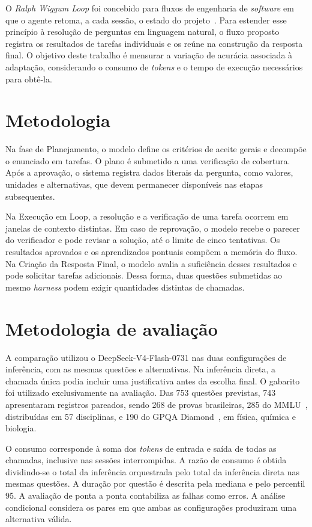 \documentclass[a4paper,10pt, twocolumn]{article}
\begin{document}
O \textit{Ralph Wiggum Loop} foi concebido para fluxos de engenharia de \textit{software} em que o agente retoma, a cada sessão, o estado do projeto~\cite{huntley}. Para estender esse princípio à resolução de perguntas em linguagem natural, o fluxo proposto registra os resultados de tarefas individuais e os reúne na construção da resposta final. O objetivo deste trabalho é mensurar a variação de acurácia associada à adaptação, considerando o consumo de \textit{tokens} e o tempo de execução necessários para obtê-la.

\section{Metodologia}

Na fase de Planejamento, o modelo define os critérios de aceite gerais e decompõe o enunciado em tarefas. O plano é submetido a uma verificação de cobertura. Após a aprovação, o sistema registra dados literais da pergunta, como valores, unidades e alternativas, que devem permanecer disponíveis nas etapas subsequentes.

\newpage
Na Execução em Loop, a resolução e a verificação de uma tarefa ocorrem em janelas de contexto distintas. Em caso de reprovação, o modelo recebe o parecer do verificador e pode revisar a solução, até o limite de cinco tentativas. Os resultados aprovados e os aprendizados pontuais compõem a memória do fluxo. Na Criação da Resposta Final, o modelo avalia a suficiência desses resultados e pode solicitar tarefas adicionais. Dessa forma, duas questões submetidas ao mesmo \textit{harness} podem exigir quantidades distintas de chamadas.

\section{Metodologia de avaliação}

A comparação utilizou o DeepSeek-V4-Flash-0731 nas duas configurações de inferência, com as mesmas questões e alternativas. Na inferência direta, a chamada única podia incluir uma justificativa antes da escolha final. O gabarito foi utilizado exclusivamente na avaliação. Das 753 questões previstas, 743 apresentaram registros pareados, sendo 268 de provas brasileiras, 285 do MMLU~\cite{mmlu}, distribuídas em 57 disciplinas, e 190 do GPQA Diamond~\cite{gpqa}, em física, química e biologia.

O consumo corresponde à soma dos \textit{tokens} de entrada e saída de todas as chamadas, inclusive nas sessões interrompidas. A razão de consumo é obtida dividindo-se o total da inferência orquestrada pelo total da inferência direta nas mesmas questões. A duração por questão é descrita pela mediana e pelo percentil 95. A avaliação de ponta a ponta contabiliza as falhas como erros. A análise condicional considera os pares em que ambas as configurações produziram uma alternativa válida.
\end{document}
